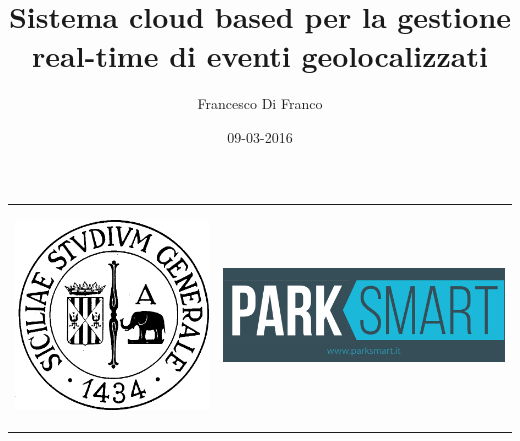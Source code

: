 \documentclass{beamer}
\title[Relazione progetto finale]{Sistema cloud based per la gestione real-time di eventi geolocalizzati}
\author{Francesco Di Franco} %
\institute[UniCT] 
{
Univerist\`a degli studi di Catania \\ %
\medskip
\textit{} 
}
\date{09-03-2016}
\begin{document}
\begin{frame}
\begin{table}[]
\centering
\begin{tabular}{ll}

\begin{minipage}{0.4\textwidth}
\begin{center}
\includegraphics[scale=0.15]{../img/logo_unict.png}
\end{center}
\end{minipage}

&  
\begin{minipage}{0.5\textwidth}

\includegraphics[scale=0.07]{../img/logoPSM.png}

\end{minipage}

\end{tabular}
\end{table}
\titlepage
\end{frame}
\end{document}

